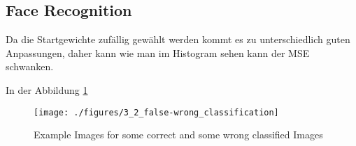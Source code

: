 \subsection{Face Recognition}

Da die Startgewichte zufällig gewählt werden kommt es zu unterschiedlich guten Anpassungen, daher kann wie man im Histogram sehen kann der MSE schwanken.


In der Abbildung \ref{fig:face_false_wrong}

\begin{figure}[hp!]
\begin{center}
 \texttt{[image: ./figures/3\_2\_false-wrong\_classification]}
 \caption{Example Images for some correct and some wrong classified Images}
\label{fig:face_false_wrong}
\end{center}
\end{figure}